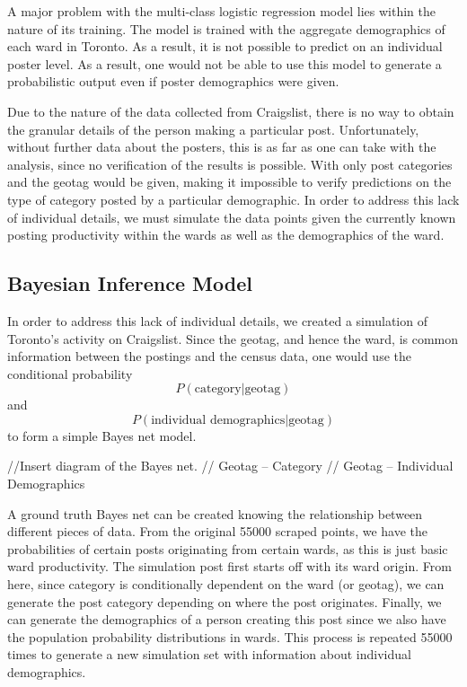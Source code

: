 \documentclass[12pt]{article}
\begin{document}
A major problem with the multi-class logistic regression model lies within the nature of its training. The model is trained with the aggregate demographics of each ward in Toronto. As a result, it is not possible to predict on an individual poster level. As a result, one would not be able to use this model to generate a probabilistic output even if poster demographics were given. 

Due to the nature of the data collected from Craigslist, there is no way to obtain the granular details of the person making a particular post. Unfortunately, without further data about the posters, this is as far as one can take with the analysis, since no verification of the results is possible. With only post categories and the geotag would be given, making it impossible to verify predictions on the type of category posted by a particular demographic. In order to address this lack of individual details, we must simulate the data points given the currently known posting productivity within the wards as well as the demographics of the ward. 

\subsection{Bayesian Inference Model}
In order to address this lack of individual details, we created a simulation of Toronto's activity on Craigslist. Since the geotag, and hence the ward, is common information between the postings and the census data, one would use the conditional probability \[P(\text{category} | \text{geotag})\] and \[P(\text{individual demographics} | \text{geotag})\] to form a simple Bayes net model. 

//Insert diagram of the Bayes net. 
// Geotag --\> Category
// Geotag --\> Individual Demographics

A ground truth Bayes net can be created knowing the relationship between different pieces of data. From the original 55000 scraped points, we have the probabilities of certain posts originating from certain wards, as this is just basic ward productivity. The simulation post first starts off with its ward origin. From here, since category is conditionally dependent on the ward (or geotag), we can generate the post category depending on where the post originates. Finally, we can generate the demographics of a person creating this post since we also have the population probability distributions in wards. This process is repeated 55000 times to generate a new simulation set with information about individual demographics.
\end{document}
